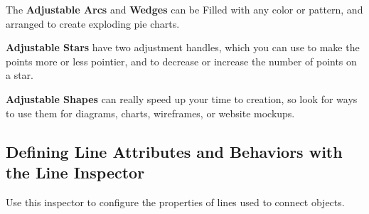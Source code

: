 \documentclass[../main.tex]{subfiles}
\begin{document}

The \textbf{Adjustable Arcs} and \textbf{Wedges} can be Filled with any color or pattern, and
arranged to create exploding pie charts.


\textbf{Adjustable Stars} have two adjustment handles, which you can use to make the points more
or less pointier, and to decrease or increase the number of points on a star.


\textbf{Adjustable Shapes} can really speed up your time to creation, so look for ways to use
them for diagrams, charts, wireframes, or website mockups.

\subsection{Defining Line Attributes and Behaviors with the Line Inspector}

Use this inspector to configure the properties of lines used to connect objects.

\end{document}
